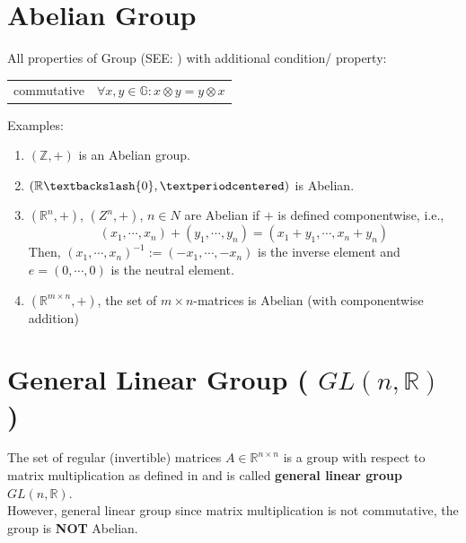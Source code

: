 \section{Abelian Group \cite{mfml-1}}\label{Abelian Group}

All properties of Group (SEE: ) with additional condition/ property:

\begin{table}[H]
    \begin{tabular}{l l}
        commutative \hspace{0.5cm} & $\forall x,y \in \mathbb{G}:x\otimes y = y\otimes x$ \\
    \end{tabular}
\end{table}

Examples:
\begin{enumerate}
    \item $(\mathbb{Z}, +)$ is an Abelian group.
    \item $(\mathbb{R}\textbackslash {0}, ·)$ is Abelian.
    \item $(\mathbb{R}^n, +)$, $(Z^n, +)$, $n \in N$ are Abelian if $+$ is defined componentwise, i.e., 
    \[
        (x_1, \cdots , x_n) + (y_1, \cdots , y_n) = (x_1 + y_1, \cdots , x_n + y_n)
    \]
    Then, $(x_1, \cdots , x_n)^{-1} := (-x_1, \cdots , -x_n)$ is the inverse element and $e = (0, \cdots , 0)$ is the neutral element.
    \item $(\mathbb{R}^{m\times n}, +)$, the set of $m \times n$-matrices is Abelian (with componentwise addition)
\end{enumerate}










\section{General Linear Group ( $GL(n,\mathbb{R})$ ) \cite{mfml-1}}\label{General Linear Group}

The set of regular (invertible) matrices $A \in \mathbb{R}^{n \times n}$ is a group with respect to matrix multiplication as defined in and is called \textbf{general linear group} $GL(n, \mathbb{R})$.\\
However, general linear group since matrix multiplication is not commutative, the group is \textbf{NOT} Abelian.

